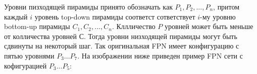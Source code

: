 
Уровни пизходящей пирамиды принято обозначать как $P_1, P_2, ..., P_n$, притом каждый $i$ уровень top-down пирамиды соответст сответствует $i$-му уровню bottom-up пирамиды $C_1, C_2, ..., C_n$. Кллличество $P$ уровней может быть меньше от колличества уровней $С$. Тогда уровни низходящей пирамиды могут быть сдвинуты на некоторый шаг. Так оригинальная FPN имеет конфигурацию с пятью уровнями $P_3...P_7$. На изображении ниже приведен пример FPN сети с кофигурацией $P_3...P_5$:

